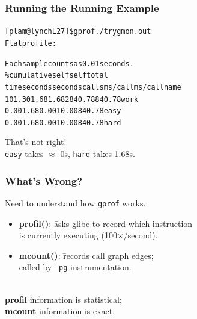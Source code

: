 \documentclass[aspectratio=43]{beamer}
\newenvironment{changemargin}[1]{%
  \begin{list}{}{%
    \setlength{\topsep}{0pt}%
    \setlength{\leftmargin}{#1}%
    \setlength{\rightmargin}{1em}
    \setlength{\listparindent}{\parindent}%
    \setlength{\itemindent}{\parindent}%
    \setlength{\parsep}{\parskip}%
  }%
  \item[]}{\end{list}}
\begin{document}
\begin{frame}[fragile]
  \frametitle{Running the Running Example}

\begin{alltt}
[plam@lynch L27]\$ gprof ./try gmon.out
Flat profile:

Each sample counts as 0.01 seconds.
  \%   cumulative   self              self     total           
 time   seconds   seconds    calls  ms/call  ms/call  name    
101.30      1.68     1.68        2   840.78   840.78  work
  0.00      1.68     0.00        1     0.00   \alert{840.78}  easy
  0.00      1.68     0.00        1     0.00   \alert{840.78}  hard
\end{alltt}

\begin{changemargin}{2cm}
  That's not right! \\
  {\tt easy} takes $\approx$ 0s, {\tt hard} takes 1.68s.
\end{changemargin}
\end{frame}

\begin{frame}[fragile]
  \frametitle{What's Wrong?}

  \begin{changemargin}{2cm}
    Need to understand how {\tt gprof} works.\\[1em]
    \begin{itemize}
    \item
      \begin{tabbing}
      {\bf profil()}: \= asks glibc to record which instruction \\
      \> is currently executing
      (100$\times$/second).
      \end{tabbing}
    \item
      \begin{tabbing}
        {\bf mcount()}: \= records call graph edges;\\
        \> called by {\tt -pg} instrumentation.
      \end{tabbing}
    \end{itemize}
~\\
    {\bf profil} information is statistical; \\
    {\bf mcount} information is exact.
\end{changemargin}
\end{frame}
\end{document}
